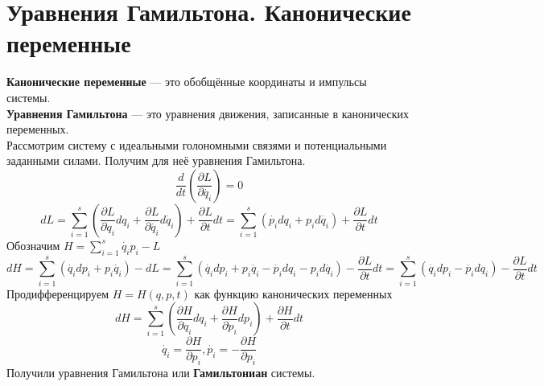 \documentclass[fleqn,a4paper,12pt,titlepage,finall]{article}
\begin{document}
\section{Уравнения Гамильтона. Канонические переменные}
{\bf Канонические переменные} --- это обобщённые координаты и импульсы
системы.\\
{\bf Уравнения Гамильтона} --- это уравнения движения, записанные в канонических
переменных. \\
Рассмотрим систему с идеальными голономными связями и потенциальными заданными
силами. Получим для неё уравнения Гамильтона.
\[\frac{d}{dt}\left(\frac{\partial L}{\partial\dot{q_i}}\right) = 0\]
\[dL = \sum_{i=1}^s\left(\frac{\partial L}{\partial q_i}dq_i + \frac{\partial L}
{\partial \dot{q_i}}d\dot{q_i}\right) + \frac{\partial L}{\partial t}dt =
\sum_{i=1}^s\left(\dot{p_i}dq_i + p_id\dot{q_i}\right) + \frac{\partial
L}{\partial t}dt \]
Обозначим $H = \sum_{i=1}^s\dot{q_i}p_i-L$
\[dH = \sum_{i=1}^s\left(\dot{q_i}dp_i + p_i\dot{q_i}\right) - dL =
\sum_{i=1}^s\left(\dot{q_i}dp_i + p_i\dot{q_i} - \dot{p_i}dq_i -
p_id\dot{q_i}\right) - \frac{\partial L}{\partial t}dt =
\sum_{i=1}^s\left(\dot{q_i}dp_i - \dot{p_i}dq_i \right) - \frac{\partial
L}{\partial t}dt\]
Продифференцируем $H = H(q, p, t)$ как функцию канонических переменных
\[dH = \sum_{i=1}^s\left(\frac{\partial H}{\partial q_i}dq_i + \frac{\partial
H}{\partial p_i}dp_i\right) + \frac{\partial H}{\partial t}dt\]
\[\boxed{\dot{q_i} = \frac{\partial H}{\partial p_i}, \dot{p_i} =
-\frac{\partial H}{\partial p_i}}\]
Получили уравнения Гамильтона или {\bf Гамильтониан} системы.
\end{document}
